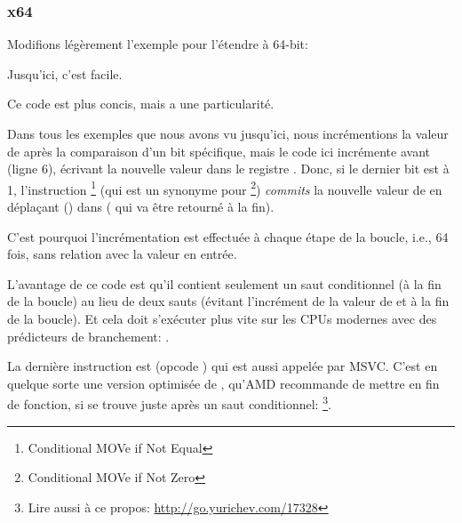 \subsubsection{x64}
\label{subsec:popcnt}

Modifions légèrement l'exemple pour l'étendre à 64-bit:




Jusqu'ici, c'est facile.






Ce code est plus concis, mais a une particularité.

Dans tous les exemples que nous avons vu jusqu'ici, nous incrémentions la valeur
de  après la comparaison d'un bit spécifique, mais le code ici incrémente 
avant (ligne 6), écrivant la nouvelle valeur dans le registre \EDX.
Donc, si le dernier bit est à 1, l'instruction \CMOVNE\footnote{Conditional MOVe if Not Equal}
(qui est un synonyme pour \CMOVNZ\footnote{Conditional MOVe if Not Zero}) \emph{commits}
la nouvelle valeur de  en déplaçant  \EDX () dans
\EAX ( qui va être retourné à la fin).

C'est pourquoi l'incrémentation est effectuée à chaque étape de la boucle, i.e.,
64 fois, sans relation avec la valeur en entrée.

L'avantage de ce code est qu'il contient seulement un saut conditionnel (à la fin
de la boucle) au lieu de deux sauts (évitant l'incrément de la valeur de  et
à la fin de la boucle).
Et cela doit s'exécuter plus vite sur les CPUs modernes avec des prédicteurs de branchement:
.

\label{FATRET}
La dernière instruction est  (opcode ) qui est aussi appelée
 par MSVC.
C'est en quelque sorte une version optimisée de \RET, qu'AMD recommande de mettre
en fin de fonction, si \RET se trouve juste après un saut conditionnel:
\footnote{Lire aussi à ce propos: \url{http://go.yurichev.com/17328}}.

